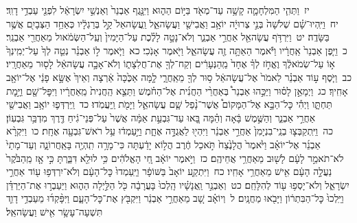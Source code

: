 \documentclass[18pt]{article}
\begin{document}
 {\loc יז~}וַתְּהִ֧י הַמִּלְחָמָ֛ה קָשָׁ֥ה עַד־מְאֹ֖ד בַּיּ֣וֹם הַה֑וּא וַיִּנָּ֤גֶף אַבְנֵר֙ וְאַנְשֵׁ֣י יִשְׂרָאֵ֔ל לִפְנֵ֖י עַבְדֵ֥י דָוִֽד׃ \startlock
 {\loc יח~}וַיִּֽהְיוּ־שָׁ֗ם שְׁלֹשָׁה֙ בְּנֵ֣י צְרוּיָ֔ה יוֹאָ֥ב וַאֲבִישַׁ֖י וַעֲשָׂהאֵ֑ל וַֽעֲשָׂהאֵל֙ קַ֣ל בְּרַגְלָ֔יו כְּאַחַ֥ד הַצְּבָיִ֖ם אֲשֶׁ֥ר בַּשָּׂדֶֽה׃ \startlock
 {\loc יט~}וַיִּרְדֹּ֥ף עֲשָׂהאֵ֖ל אַחֲרֵ֣י אַבְנֵ֑ר וְלֹא־נָטָ֣ה לָלֶ֗כֶת עַל־הַיָּמִין֙ וְעַֽל־הַשְּׂמֹ֔אול מֵאַחֲרֵ֖י אַבְנֵֽר׃ \startlock
 {\loc כ~}וַיִּ֤פֶן אַבְנֵר֙ אַֽחֲרָ֔יו וַיֹּ֕אמֶר הַאַתָּ֥ה זֶ֖ה עֲשָׂהאֵ֑ל וַיֹּ֖אמֶר אָנֹֽכִי׃ \startlock
 {\loc כא~}וַיֹּ֧אמֶר ל֣וֹ אַבְנֵ֗ר נְטֵ֤ה לְךָ֙ עַל־יְמִֽינְךָ֙ א֣וֹ עַל־שְׂמֹאלֶ֔ךָ וֶאֱחֹ֣ז לְךָ֗ אֶחָד֙ מֵֽהַנְּעָרִ֔ים וְקַח־לְךָ֖ אֶת־חֲלִצָת֑וֹ וְלֹא־אָבָ֣ה עֲשָׂהאֵ֔ל לָס֖וּר מֵאַחֲרָֽיו׃ \startlock
 {\loc כב~}וַיֹּ֧סֶף ע֣וֹד אַבְנֵ֗ר לֵאמֹר֙ אֶל־עֲשָׂהאֵ֔ל ס֥וּר לְךָ֖ מֵאַֽחֲרָ֑י לָ֤מָּה אַכֶּ֙כָּה֙ אַ֔רְצָה וְאֵיךְ֙ אֶשָּׂ֣א פָנַ֔י אֶל־יוֹאָ֖ב אָחִֽיךָ׃ \startlock
 {\loc כג~}וַיְמָאֵ֣ן לָס֗וּר וַיַּכֵּ֣הוּ אַבְנֵר֩ בְּאַחֲרֵ֨י הַחֲנִ֜ית אֶל־הַחֹ֗מֶשׁ וַתֵּצֵ֤א הַֽחֲנִית֙ מֵֽאַחֲרָ֔יו וַיִּפׇּל־שָׁ֖ם וַיָּ֣מׇת תַּחְתָּ֑ו וַיְהִ֡י כׇּל־הַבָּ֣א אֶל־הַמָּקוֹם֩ אֲשֶׁר־נָ֨פַל שָׁ֧ם עֲשָׂהאֵ֛ל וַיָּמֹ֖ת וַֽיַּעֲמֹֽדוּ׃ \startlock
 {\loc כד~}וַֽיִּרְדְּפ֛וּ יוֹאָ֥ב וַאֲבִישַׁ֖י אַחֲרֵ֣י אַבְנֵ֑ר וְהַשֶּׁ֣מֶשׁ בָּ֔אָה וְהֵ֗מָּה בָּ֚אוּ עַד־גִּבְעַ֣ת אַמָּ֔ה אֲשֶׁר֙ עַל־פְּנֵי־גִ֔יחַ דֶּ֖רֶךְ מִדְבַּ֥ר גִּבְעֽוֹן׃ \startlock
 {\loc כה~}וַיִּֽתְקַבְּצ֤וּ בְנֵֽי־בִנְיָמִן֙ אַחֲרֵ֣י אַבְנֵ֔ר וַיִּהְי֖וּ לַאֲגֻדָּ֣ה אֶחָ֑ת וַיַּ֣עַמְד֔וּ עַ֥ל רֹאשׁ־גִּבְעָ֖ה אֶחָֽת׃ \startlock
 {\loc כו~}וַיִּקְרָ֨א אַבְנֵ֜ר אֶל־יוֹאָ֗ב וַיֹּ֙אמֶר֙ הֲלָנֶ֙צַח֙ תֹּ֣אכַל חֶ֔רֶב הֲל֣וֹא יָדַ֔עְתָּה כִּי־מָרָ֥ה תִֽהְיֶ֖ה בָּאַֽחֲרוֹנָ֑ה וְעַד־מָתַי֙ לֹא־תֹאמַ֣ר לָעָ֔ם לָשׁ֖וּב מֵאַחֲרֵ֥י אֲחֵיהֶֽם׃ \startlock
 {\loc כז~}וַיֹּ֣אמֶר יוֹאָ֔ב חַ֚י הָאֱלֹהִ֔ים כִּ֥י לוּלֵ֖א דִּבַּ֑רְתָּ כִּ֣י אָ֤ז מֵֽהַבֹּ֙קֶר֙ נַעֲלָ֣ה הָעָ֔ם אִ֖ישׁ מֵאַחֲרֵ֥י אָחִֽיו׃ \startlock
 {\loc כח~}וַיִּתְקַ֤ע יוֹאָב֙ בַּשּׁוֹפָ֔ר וַיַּֽעַמְדוּ֙ כׇּל־הָעָ֔ם וְלֹא־יִרְדְּפ֥וּ ע֖וֹד אַחֲרֵ֣י יִשְׂרָאֵ֑ל וְלֹא־יָסְפ֥וּ ע֖וֹד לְהִלָּחֵֽם׃ \startlock
 {\loc כט~}וְאַבְנֵ֣ר וַֽאֲנָשָׁ֗יו הָֽלְכוּ֙ בָּעֲרָבָ֔ה כֹּ֖ל הַלַּ֣יְלָה הַה֑וּא וַיַּעַבְר֣וּ אֶת־הַיַּרְדֵּ֗ן וַיֵּֽלְכוּ֙ כׇּל־הַבִּתְר֔וֹן וַיָּבֹ֖אוּ מַחֲנָֽיִם׃ \startlock
 {\loc ל~}וְיוֹאָ֗ב שָׁ֚ב מֵאַחֲרֵ֣י אַבְנֵ֔ר וַיִּקְבֹּ֖ץ אֶת־כׇּל־הָעָ֑ם וַיִּפָּ֨קְד֜וּ מֵעַבְדֵ֥י דָוִ֛ד תִּשְׁעָה־עָשָׂ֥ר אִ֖ישׁ וַעֲשָׂהאֵֽל׃ \startlock
\end{document}
